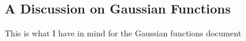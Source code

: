 \documentclass[{project report}.tex]{subfiles}
\begin{document}
\subsection{A Discussion on Gaussian Functions}
This is what I have in mind for the Gaussian functions document
\end{document}
